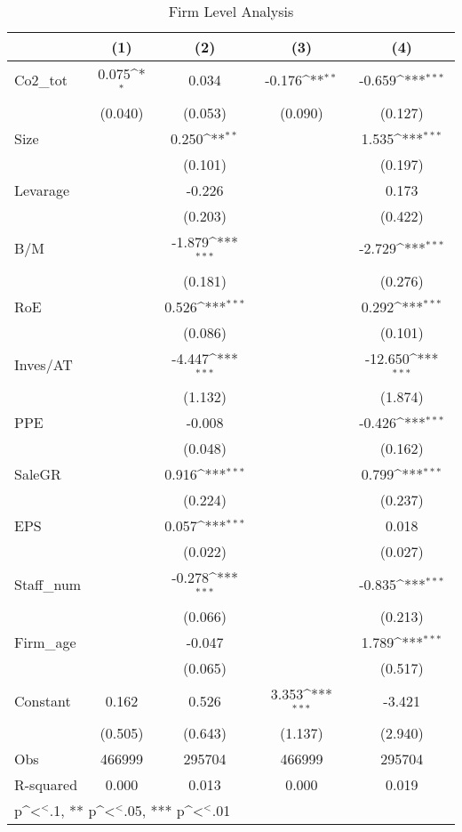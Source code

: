 \begin{table}[]
\caption{Firm Level Analysis}
\label{tab: firm_level}
{
\def\sym#1{\ifmmode^{#1}\else\(^{#1}\)\fi}
\begin{tabular}{@{\extracolsep{2pt}}l*{4}{c}@{}}
\hline\hline


 & (1) & (2) & (3) & (4) \\
\hline
Co2\_tot & 0.075\sym{*} & 0.034 & -0.176\sym{**} & -0.659\sym{***} \\
 & (0.040) & (0.053) & (0.090) & (0.127) \\
Size &  & 0.250\sym{**} &  & 1.535\sym{***} \\
 &  & (0.101) &  & (0.197) \\
Levarage &  & -0.226 &  & 0.173 \\
 &  & (0.203) &  & (0.422) \\
B/M &  & -1.879\sym{***} &  & -2.729\sym{***} \\
 &  & (0.181) &  & (0.276) \\
RoE &  & 0.526\sym{***} &  & 0.292\sym{***} \\
 &  & (0.086) &  & (0.101) \\
Inves/AT &  & -4.447\sym{***} &  & -12.650\sym{***} \\
 &  & (1.132) &  & (1.874) \\
PPE &  & -0.008 &  & -0.426\sym{***} \\
 &  & (0.048) &  & (0.162) \\
SaleGR &  & 0.916\sym{***} &  & 0.799\sym{***} \\
 &  & (0.224) &  & (0.237) \\
EPS &  & 0.057\sym{***} &  & 0.018 \\
 &  & (0.022) &  & (0.027) \\
Staff\_num &  & -0.278\sym{***} &  & -0.835\sym{***} \\
 &  & (0.066) &  & (0.213) \\
Firm\_age &  & -0.047 &  & 1.789\sym{***} \\
 &  & (0.065) &  & (0.517) \\
Constant & 0.162 & 0.526 & 3.353\sym{***} & -3.421 \\
 & (0.505) & (0.643) & (1.137) & (2.940) \\

\hline
Obs & 466999 & 295704 & 466999 & 295704 \\
R-squared & 0.000 & 0.013 & 0.000 & 0.019 \\
\hline\hline
\multicolumn{5}{l}{\footnotesize * p\sym{<}.1, ** p\sym{<}.05, *** p\sym{<}.01}
\end{tabular}
}
\end{table}